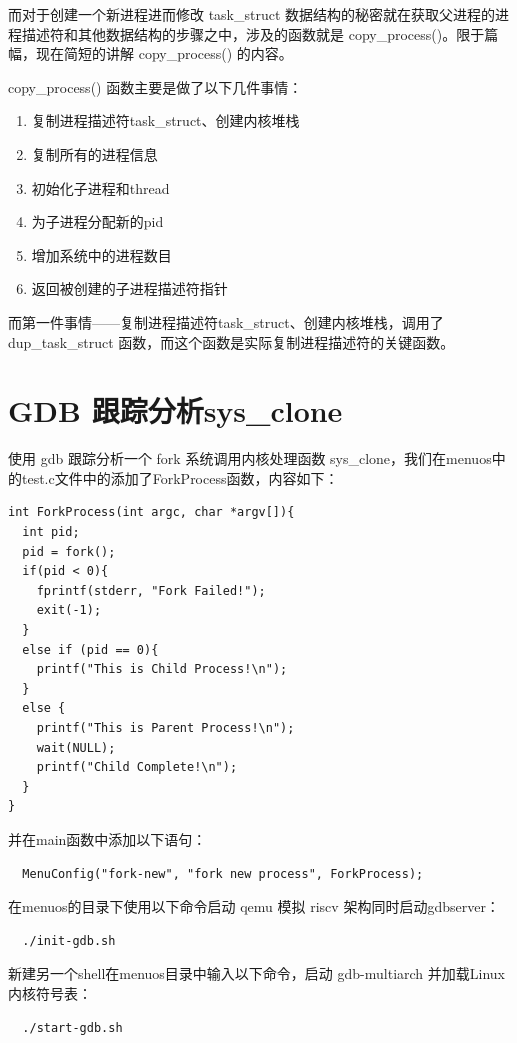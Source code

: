 \documentclass[lang=cn,10pt]{elegantbook}
\begin{document}
而对于创建一个新进程进而修改 task\_struct 数据结构的秘密就在获取父进程的进程描述符和其他数据结构的步骤之中，涉及的函数就是 copy\_process()。限于篇幅，现在简短的讲解 copy\_process() 的内容。

copy\_process() 函数主要是做了以下几件事情：

\begin{enumerate}
  \item 复制进程描述符task\_struct、创建内核堆栈
  \item 复制所有的进程信息
  \item 初始化子进程和thread
  \item 为子进程分配新的pid
  \item 增加系统中的进程数目
  \item 返回被创建的子进程描述符指针
\end{enumerate}

而第一件事情——复制进程描述符task\_struct、创建内核堆栈，调用了 dup\_task\_struct 函数，而这个函数是实际复制进程描述符的关键函数。

\section{GDB 跟踪分析sys\_clone}
使用 gdb 跟踪分析一个 fork 系统调用内核处理函数 sys\_clone，我们在menuos中的test.c文件中的添加了ForkProcess函数，内容如下：

\begin{lstlisting}
int ForkProcess(int argc, char *argv[]){
  int pid;
  pid = fork();
  if(pid < 0){
    fprintf(stderr, "Fork Failed!");
    exit(-1);
  }
  else if (pid == 0){
    printf("This is Child Process!\n");
  }
  else {
    printf("This is Parent Process!\n");
    wait(NULL);
    printf("Child Complete!\n");
  }
}
\end{lstlisting}
并在main函数中添加以下语句：

\begin{lstlisting}
  MenuConfig("fork-new", "fork new process", ForkProcess);
\end{lstlisting}

在menuos的目录下使用以下命令启动 qemu 模拟 riscv 架构同时启动gdbserver：

\begin{lstlisting}
  ./init-gdb.sh
\end{lstlisting}

新建另一个shell在menuos目录中输入以下命令，启动 gdb-multiarch 并加载Linux内核符号表：

\begin{lstlisting}
  ./start-gdb.sh
\end{lstlisting}
\end{document}
